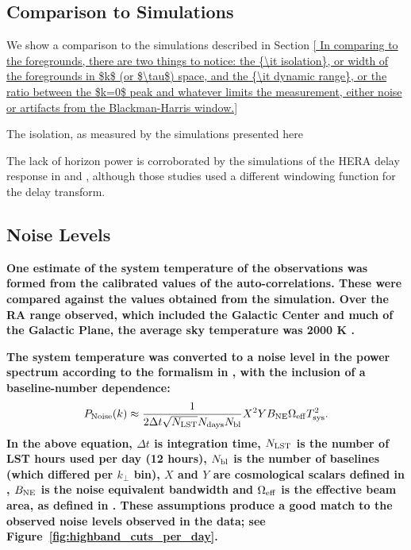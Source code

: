 \documentclass[twocolumn, trackchanges]{aastex61}
\newcommand{\edited}[1]{{\bf \color{red} #1}}
\begin{document}
{\subsection{Comparison to Simulations}

We show a comparison to the simulations described in Section \ref{

In comparing to the foregrounds, there are two things to notice: the {\it isolation}, or width of the foregrounds in $k$ (or $\tau$) space, and the {\it dynamic range}, or the ratio between the $k=0$ peak and whatever limits the measurement, either noise or artifacts from the Blackman-Harris window.}

The isolation, as measured by the simulations presented here

The lack of horizon power is corroborated by the simulations of the HERA delay response in \cite{Ewall-Wice.16} and \cite{Thyagarajan.16}, although those studies used a different windowing function for the delay transform. 

\subsection{\edited{Noise Levels}}
\label{sec:Noise}

\edited{One estimate of the system temperature of the observations was formed from the calibrated values of the auto-correlations.  These were compared against the values obtained from the simulation.  Over the RA range observed, which included the Galactic Center and much of the Galactic Plane, the average sky temperature was 2000 K \citep[][also see the public \href{http://reionization.org/wp-content/uploads/2017/04/HERA19_Tsys_3April2017.pdf}{\edited{\underline{HERA Memo \#16}}}]{deBoer17}.}

\edited{The system temperature was converted to a noise level in the power spectrum according to the formalism in \cite{Parsons.12a}, with the inclusion of a baseline-number dependence:
\begin{equation}
P_{\rm Noise}(k) \approx \frac{1}{2\Delta t \sqrt{N_{\rm LST}} N_{\rm days} N_{\rm bl}} X^2 Y B_{\rm NE} \Omega_{\rm eff} T_{\rm sys}^2.
\end{equation}
In the above equation, $\Delta t$ is integration time, $N_{\rm LST}$ is the number of LST hours used per day (12 hours), $N_{\rm bl}$ is the number of baselines (which differed per $k_{\perp}$ bin), $X$ and $Y$ are cosmological scalars defined in \cite{Parsons.12a}, $B_{\rm NE}$ is the noise equivalent bandwidth and $\Omega_{\rm eff}$ is the effective beam area, as defined in \cite{Parsons14}.  These assumptions produce a good match to the observed noise levels observed in the data; see Figure~\ref{fig:highband_cuts_per_day}.}

}
\end{document}
